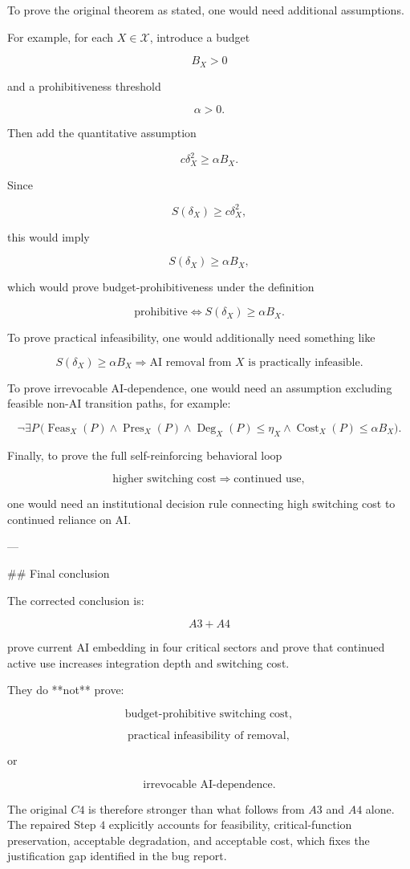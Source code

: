 To prove the original theorem as stated, one would need additional assumptions.

For example, for each \(X\in\mathcal X\), introduce a budget

\[
B_X>0
\]

and a prohibitiveness threshold

\[
\alpha>0.
\]

Then add the quantitative assumption

\[
c\delta_X^2\ge \alpha B_X.
\]

Since

\[
S(\delta_X)\ge c\delta_X^2,
\]

this would imply

\[
S(\delta_X)\ge \alpha B_X,
\]

which would prove budget-prohibitiveness under the definition

\[
\text{prohibitive}
\iff
S(\delta_X)\ge \alpha B_X.
\]

To prove practical infeasibility, one would additionally need something like

\[
S(\delta_X)\ge \alpha B_X
\Longrightarrow
\text{AI removal from }X\text{ is practically infeasible}.
\]

To prove irrevocable AI-dependence, one would need an assumption excluding feasible non-AI transition paths, for example:

\[
\neg\exists P\,
\bigl(
\operatorname{Feas}_X(P)
\land
\operatorname{Pres}_X(P)
\land
\operatorname{Deg}_X(P)\le \eta_X
\land
\operatorname{Cost}_X(P)\le \alpha B_X
\bigr).
\]

Finally, to prove the full self-reinforcing behavioral loop

\[
\text{higher switching cost}
\Longrightarrow
\text{continued use},
\]

one would need an institutional decision rule connecting high switching cost to continued reliance on AI.

---

## Final conclusion

The corrected conclusion is:

\[
A3+A4
\]

prove current AI embedding in four critical sectors and prove that continued active use increases integration depth and switching cost.

They do **not** prove:

\[
\text{budget-prohibitive switching cost},
\]

\[
\text{practical infeasibility of removal},
\]

or

\[
\text{irrevocable AI-dependence}.
\]

The original \(C4\) is therefore stronger than what follows from \(A3\) and \(A4\) alone. The repaired Step \(4\) explicitly accounts for feasibility, critical-function preservation, acceptable degradation, and acceptable cost, which fixes the justification gap identified in the bug report.